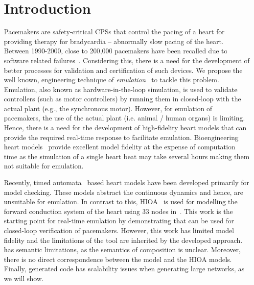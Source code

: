 \section{Introduction}

Pacemakers are safety-critical \acp{CPS} that control the pacing of a
heart for providing therapy for bradycardia -- abnormally slow pacing of
the heart. %
Between 1990-2000, close to 200,000 pacemakers have been
recalled due to software related
failures~\cite{alemzadeh13}. Considering this, there is a need for the
development of better processes for validation and certification of such
devices. We propose the well known, engineering
technique of \emph{emulation}~\cite{patel2015survey} to tackle this
problem. Emulation, also known as hardware-in-the-loop simulation, is
used to validate controllers (such as motor controllers) by running them
in closed-loop with the actual plant (e.g., the synchronous motor).
However, for emulation of pacemakers, the use of the actual plant
(i.e. animal / human organs) is limiting. Hence, there is a need for the
development of high-fidelity heart models that can provide the required
real-time response to facilitate emulation. Bioengineering heart
models~\cite{Trayanova2014} provide excellent model fidelity at the
expense of computation time as the simulation of a single heart beat may
take several hours making them not suitable for emulation.

Recently, timed automata~\cite{zhihao12} based heart models have been
developed primarily for model checking. These models abstract the
continuous dynamics and hence, are unsuitable for emulation. In contrast
to this, \acf{HIOA}~\cite{alur2015book, raskin05} is used for modelling
the forward conduction system of the heart using 33 nodes
in~\cite{chen14}.
This work is the starting point for real-time
emulation by demonstrating that \simulink can be used for closed-loop
verification of pacemakers. However, this work has limited model
fidelity and the limitations of the tool \simulink are inherited by the
developed approach. \simulink has semantic limitations, as the semantics
of composition is unclear. Moreover, there is no
direct correspondence between the \simulink model and the \ac{HIOA}
models. Finally, \simulink generated code has scalability issues when 
generating large networks, as we will show.


